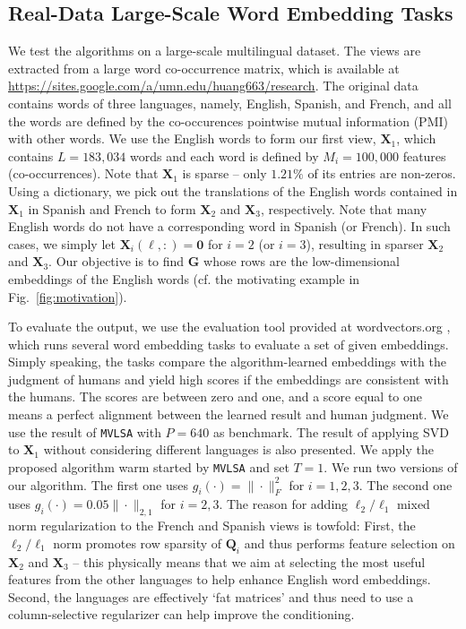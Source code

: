 \documentclass[10pt,journal]{IEEEtran}
\newcommand{\Q}{\boldsymbol{Q}}
\newcommand{\X}{\boldsymbol{X}}
\begin{document}
\subsection{Real-Data Large-Scale Word Embedding Tasks}
We test the algorithms on a large-scale multilingual dataset.
The views are extracted from a large word co-occurrence matrix, which is available at \url{https://sites.google.com/a/umn.edu/huang663/research}.
The original data contains words of three languages, namely, English, Spanish, and French,
and all the words are defined by the co-occurences pointwise mutual information (PMI) with other words.
We use the English words to form our first view, ${\bm X}_1$, which contains $L=183,034$ words and each word is defined by $M_i=100,000$ features (co-occurrences). Note that ${\bm X}_1$ is sparse -- only $1.21\%$ of its entries are non-zeros.
Using a dictionary, we pick out the translations of the English words contained in ${\bm X}_1$ in Spanish and French to form ${\bm X}_2$ and ${\bm X}_3$, respectively.
Note that many English words do not have a corresponding word in Spanish (or French).
In such cases, we simply let ${\bm X}_i(\ell,:)={\bm 0}$ for $i=2$ (or $i=3$),
resulting in sparser ${\bm X}_2$ and ${\bm X}_3$.
Our objective is to find ${\bm G}$ whose rows are the low-dimensional embeddings of the English words (cf. the motivating example in Fig.~\ref{fig:motivation}).

To evaluate the output, we use the evaluation tool provided at {wordvectors.org} \cite{faruqui-2014:SystemDemo}, which runs several word embedding tasks to evaluate a set of given embeddings. Simply speaking, the tasks compare the algorithm-learned
embeddings with the judgment of humans and yield high scores if the embeddings are consistent with the humans. The scores are between zero and one,
and a score equal to one means a perfect alignment between the learned result and human judgment.
We use the result of \texttt{MVLSA} with $P=640$ as benchmark. 
The result of applying SVD to ${\bm X}_1$ without considering different languages is also presented.
We apply the proposed algorithm warm started by \texttt{MVLSA} and set $T=1$.
We run two versions of our algorithm. The first one uses $g_i(\cdot)=\|\cdot\|_F^2$
for $i=1,2,3$.
The second one uses $g_i(\cdot)=0.05\|\cdot\|_{2,1}$ for $i=2,3$.
The reason for adding $\ell_2/\ell_1$ mixed norm regularization to the French and Spanish views
is towfold:
First, the $\ell_2/\ell_1$ norm promotes row sparsity of $\Q_i$ and thus performs feature selection on $\X_2$ and $\X_3$ -- this physically means that we aim at selecting the most useful features from the other languages to help enhance English word embeddings.
Second, the languages are effectively `fat matrices' and thus need to use a column-selective regularizer can help improve the conditioning.
\end{document}
